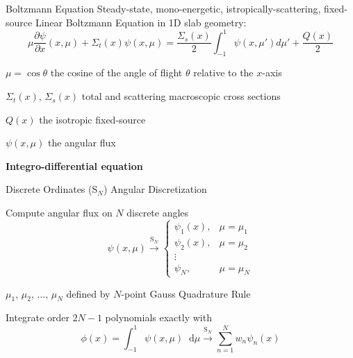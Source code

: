 \documentclass[10pt]{beamer}
\newcommand{\SN}{S$_N$\xspace}
\newcommand{\ud}{\mathop{}\!\mathrm{d}} %
\newcommand{\pderiv}[2]{\frac{\partial #1}{\partial #2}}
\begin{document}
\begin{frame}{Boltzmann Equation}
	Steady-state, mono-energetic, istropically-scattering, fixed-source \alert{Linear Boltzmann Equation} in 1D slab geometry:
	\begin{equation*}
		\mu \pderiv{\psi}{x}(x, \mu) + \Sigma_t(x) \psi(x,\mu) = 
		\frac{\Sigma_s(x)}{2} \int_{-1}^{1} \psi(x, \mu') d\mu' + \frac{Q(x)}{2}
	\end{equation*}

	$\mu = \cos \theta$ the cosine of the angle of flight $\theta$ relative to the $x$-axis

	$\Sigma_t(x)$, $\Sigma_s(x)$ total and scattering macroscopic cross sections 

	$Q(x)$ the isotropic fixed-source

	$\psi(x,\mu)$ the angular flux 


	\vfill
	\centerline{\textbf{Integro-differential equation}}

\end{frame}

\begin{frame}{Discrete Ordinates (\SN) Angular Discretization}

	Compute angular flux on $N$ discrete angles
	\begin{equation*}
		\psi(x,\mu) \xrightarrow{\text{S}_N} 
		\begin{cases}
			\psi_1(x), & \mu = \mu_1 \\ 
			\psi_2(x), & \mu = \mu_2 \\ 
			\vdots \\ 
			\psi_N, & \mu = \mu_N 
		\end{cases}
	\end{equation*}

	\pause
	$\mu_1$, $\mu_2$, $\dots$, $\mu_N$ defined by $N$-point Gauss Quadrature Rule 

	\pause
	Integrate order $2N-1$ polynomials exactly with 
	\begin{equation*}
		\phi(x) = \int_{-1}^1 \psi(x, \mu) \ud\mu 
			\xrightarrow{\text{S}_N} \sum_{n=1}^N 
			w_n \psi_n(x)
	\end{equation*}

\end{frame}
\end{document}
